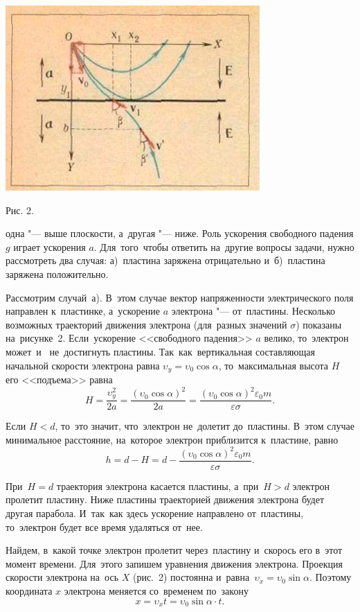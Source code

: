 \columnsep=30pt
\begin{multicols}{2}

	\includegraphics{pages/images/Picture.PNG}

	{\small Рис. 2.}	
	\vspace{3mm}

	одна "--- выше плоскости, а~другая "--- ниже. 
	Роль ускорения свободного падения $g$ играет ускорения $a$.
	Для~того~чтобы ответить на~другие вопросы задачи, нужно рассмотреть два случая: а)~пластина заряжена отрицательно и~б)~пластина заряжена положительно.

	Рассмотрим случай~а). 
	В~этом случае вектор напряженности электрического поля направлен к~пластинке, а~ускорение $a$ электрона "--- от~пластины. 
	Несколько возможных траекторий движения электрона (для~разных значений $\sigma$) показаны на~рисунке~2. 
	Если~ускорение <<свободного падения>> $a$ велико, то~электрон может~и~ не~достигнуть пластины. 
	Так~как~вертикальная составляющая начальной скорости электрона равна $\upsilon_y=\upsilon_0\cos \alpha$, то~максимальная высота $H$ его <<подъема>> равна
	\[
		H=\frac{\upsilon_y^2}{2a}=\frac{(\upsilon_0\cos \alpha)^2}{2a}=
\frac{(\upsilon_0 \cos \alpha)^2 \varepsilon_0 m}{\varepsilon \sigma}. \tag{3} \label{3}
	\]

	Если $H<d$, то~это значит, что~электрон не~долетит до~пластины. В~этом случае минимальное расстояние, на~которое электрон приблизится к~пластине, равно
	\[
		h=d-H=d-\frac{(\upsilon_0 \cos \alpha)^2 \varepsilon_0 m}{\varepsilon \sigma}.		
	\]

	При~$H=d$ траектория электрона касается пластины, а~при~$H>d$ электрон пролетит пластину. Ниже пластины траекторией движения электрона будет другая парабола.
	И~так~как здесь ускорение направлено от~пластины, то~электрон будет все время удаляться от~нее.
		
	Найдем, в~какой точке электрон пролетит через~пластину и~скорось его в~этот момент времени. 
	Для~этого запишем уравнения движения электрона. 
	Проекция скорости электрона на~ось $X$ (рис.~2) постоянна и~равна~$\upsilon_x=\upsilon_0 \sin \alpha$. Поэтому координата $x$ электрона меняется со~временем по~закону
	\[
		x=\upsilon_x t = \upsilon_0 \sin \alpha \cdot t. \tag{4} \label{4}
	\]


\end{multicols}
